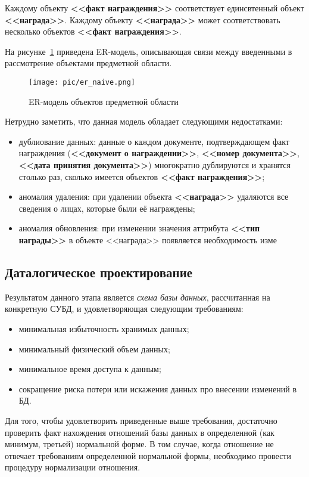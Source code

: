 Каждому объекту \textbf{<<факт награждения>>} соответствует единсвтенный
объект \textbf{<<награда>>}. 
Каждому объекту \textbf{<<награда>>} может соответствовать несколько объектов
\textbf{<<факт награждения>>}.

На рисунке~\ref{fig:er_naive} приведена ER-модель, описывающая связи между 
введенными в рассмотрение объектами предметной области.

\begin{figure}[h]
  \centering
  \texttt{[image: pic/er\_naive.png]}
  \caption{ER-модель объектов предметной области}
  \label{fig:er_naive}
\end{figure}

Нетрудно заметить, что данная модель обладает следующими недостатками:
\begin{itemize}
\item
  дублиование данных: данные о каждом документе,
  подтверждающем факт награждения
  (\textbf{<<документ о награждении>>}, \textbf{<<номер документа>>}, 
  \textbf{<<дата принятия документа>>}) многократно дублируются и хранятся столько раз,
  сколько имеется объектов \textbf{<<факт награждения>>};
\item
  аномалия удаления: при удалении объекта \textbf{<<награда>>} удаляются все сведения
  о лицах, которые были её награждены;
\item
  аномалия обновления: при изменении значения аттрибута \textbf{<<тип награды>>} в объекте
  <<награда>> появляется необходимость изме
\end{itemize}

\subsection{Даталогическое проектирование}
\label{ssub:db_data_stage}

Результатом данного этапа является \textit{схема базы данных}, рассчитанная на конкретную СУБД,
и удовлетворяющая следующим требованиям:
\begin{itemize}
  \item минимальная избыточность хранимых данных;
  \item минимальный физический объем данных;
  \item минимальное время доступа к данным;
  \item сокращение риска потери или искажения данных про внесении изменений в БД.
\end{itemize}

Для того, чтобы удовлетворить приведенные выше требования, достаточно проверить факт нахождения отношений базы данных
в определенной (как минимум, третьей) нормальной форме.
В том случае, когда отношение не отвечает требованиям определенной нормальной формы,
необходимо провести процедуру нормализации отношения.

